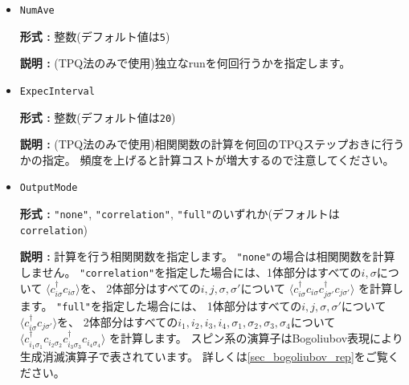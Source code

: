 \begin{itemize}
%
%
%

\item \verb|NumAve|

{\bf 形式 :} 整数(デフォルト値は\verb|5|)

{\bf 説明 :} (TPQ法のみで使用)独立なrunを何回行うかを指定します。

\item \verb|ExpecInterval|

{\bf 形式 :} 整数(デフォルト値は\verb|20|)

{\bf 説明 :} (TPQ法のみで使用)相関関数の計算を何回のTPQステップおきに行うかの指定。
頻度を上げると計算コストが増大するので注意してください。

\item \verb|OutputMode|

{\bf 形式 :} \verb|"none"|, \verb|"correlation"|, \verb|"full"|のいずれか(デフォルトは\verb|correlation|)

{\bf 説明 :} 計算を行う相関関数を指定します。
\verb|"none"|の場合は相関関数を計算しません。
\verb|"correlation"|を指定した場合には、1体部分はすべての$i, \sigma$について
$\langle c_{i \sigma}^{\dagger}c_{i \sigma} \rangle$を、
2体部分はすべての$i, j, \sigma, \sigma'$について
$\langle c_{i \sigma}^{\dagger}c_{i \sigma} c_{j \sigma'}^{\dagger}c_{j \sigma'} \rangle$
を計算します。
\verb|"full"|を指定した場合には、
1体部分はすべての$i, j, \sigma, \sigma'$について
$\langle c_{i \sigma}^{\dagger}c_{j \sigma'} \rangle$を、
2体部分はすべての$i_1, i_2, i_3, i_4, \sigma_1, \sigma_2, \sigma_3, \sigma_4$について
$\langle c_{i_1 \sigma_1}^{\dagger}c_{i_2 \sigma_2} c_{i_3 \sigma_3}^{\dagger}c_{i_4 \sigma_4} \rangle$
を計算します。
スピン系の演算子はBogoliubov表現により生成消滅演算子で表されています。
詳しくは\ref{sec_bogoliubov_rep}をご覧ください。


\end{itemize}
